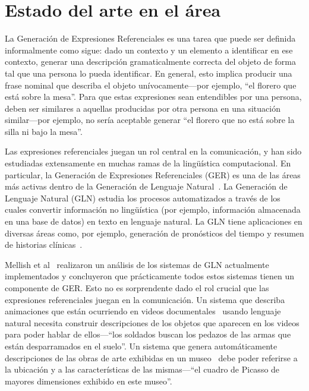 \section{Estado del arte en el \'area}
\label{intro}

La Generaci\'on de Expresiones Referenciales es una tarea que puede ser definida informalmente como sigue: dado un contexto y un elemento a identificar en ese contexto, generar una descripci\'on gramaticalmente correcta del objeto de forma tal que una persona lo pueda identificar. En general, esto implica producir una frase nominal que describa el objeto un\'ivocamente---por ejemplo, ``el florero que est\'a sobre la mesa''. Para que estas expresiones sean entendibles por una persona, deben ser similares a aquellas producidas por otra persona en una situaci\'on similar---por ejemplo, no ser\'ia aceptable generar ``el florero que no est\'a sobre la silla ni bajo la mesa''. 

Las expresiones referenciales juegan un rol central en la comunicaci\'on, y han sido estudiadas extensamente en muchas ramas de la ling\"u\'istica computacional. En particular, la Generaci\'on de Expresiones Referenciales (GER) es una de las \'areas m\'as activas dentro de la Generaci\'on de Lenguaje Natural~\cite{KrahmerEmielandVanDeemter2011}. La Generaci\'on de Lenguaje Natural (GLN) estudia los procesos automatizados a trav\'es de los cuales convertir informaci\'on no ling\"u\'istica (por ejemplo, informaci\'on almacenada en una base de datos) en texto en lenguaje natural. La GLN tiene aplicaciones en diversas \'areas como, por ejemplo, generaci\'on de pron\'osticos del tiempo y resumen de historias cl\'inicas~\cite{Reiter2000}. 

Mellish et al~\cite{Mellish2006} realizaron un an\'alisis de los sistemas de GLN actualmente implementados y concluyeron que pr\'acticamente todos estos sistemas tienen un componente de GER. Esto no es sorprendente dado el rol crucial que las expresiones referenciales juegan en la comunicaci\'on. Un sistema que describa animaciones que est\'an ocurriendo en videos documentales~\cite{Callaway2005} usando lenguaje natural necesita construir descripciones de los objetos que aparecen en los videos para poder hablar de ellos---``los soldados buscan los pedazos de las armas que est\'an desparramados en el suelo''. Un sistema que genera autom\'aticamente descripciones de las obras de arte exhibidas en un museo~\cite{Cox1999} debe poder referirse a la ubicaci\'on y a las caracter\'isticas de las mismas---``el cuadro de Picasso de mayores dimensiones exhibido en este museo''. 

